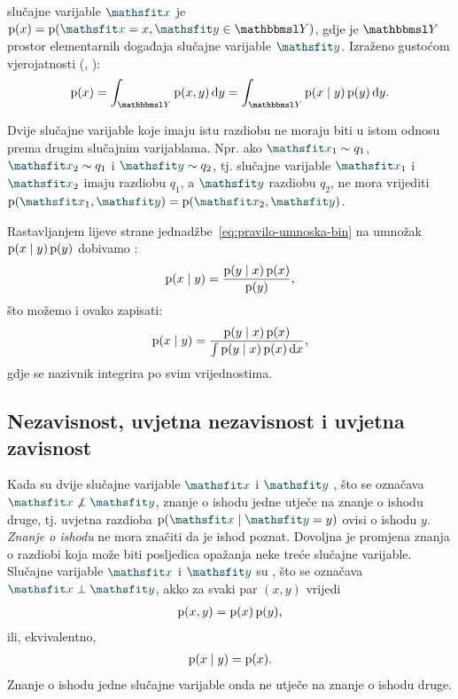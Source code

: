 \documentclass[utf8, diplomski, lmodern]{fer}
\begin{document}
 slučajne varijable $\rvar x$ je $\p(x)=\p(\rvar x=x,\rvar y\in\set Y)$, gdje je $\set Y$ prostor elementarnih događaja slučajne varijable $\rvar y$. Izraženo gustoćom vjerojatnosti (, ):
\begin{align}
\p(x) = \int_{\set Y}\p(x,y)\dif y = \int_{\set Y}\p(x\mid y)\p(y)\dif y \text{.}
\end{align}

Dvije slučajne varijable koje imaju istu razdiobu ne moraju biti u istom odnosu prema drugim slučajnim varijablama. Npr. ako $\rvar x_1\sim q_1$, $\rvar x_2\sim q_1$ i $\rvar y\sim q_2$, tj. slučajne varijable $\rvar x_1$ i $\rvar x_2$ imaju razdiobu $q_1$, a $\rvar y$ razdiobu $q_2$, ne mora vrijediti $\p(\rvar x_1, \rvar y) = \p(\rvar x_2, \rvar y)$.

Rastavljanjem lijeve strane jednadžbe~\eqref{eq:pravilo-umnoska-bin} na umnožak $\operatorname*{\mathrm{p}}(x\mid y)\operatorname*{\mathrm{p}}(y)$ dobivamo :
\begin{align}
\operatorname*{\mathrm{p}}(x\mid y) = \frac{\operatorname*{\mathrm{p}}(y\mid x)\operatorname*{\mathrm{p}}(x)}{\operatorname*{\mathrm{p}}(y)} \text{,}
\end{align}
što možemo i ovako zapisati:
\begin{align}
\operatorname*{\mathrm{p}}(x\mid y) = \frac{\operatorname*{\mathrm{p}}(y\mid x)\operatorname*{\mathrm{p}}(x)}{\int\operatorname*{\mathrm{p}}(y\mid x)\operatorname*{\mathrm{p}}(x)\mathop{}\!\mathrm{d} x} \text{,}
\end{align}
gdje se nazivnik integrira po svim vrijednostima.

\subsection{Nezavisnost, uvjetna nezavisnost i uvjetna zavisnost}

Kada su dvije slučajne varijable $\rvar x$ i $\rvar y$ , što se označava $\rvar x\not\perp\rvar y$, znanje o ishodu jedne utječe na znanje o ishodu druge, tj. uvjetna razdioba $\p\del{\rvar x\mid\rvar y = y}$ ovisi o ishodu $y$. \textit{Znanje o ishodu} ne mora značiti da je ishod poznat. Dovoljna je promjena znanja o razdiobi koja može biti posljedica opažanja neke treće slučajne varijable. Slučajne varijable $\rvar x$ i $\rvar y$ su , što se označava $\rvar x\perp\rvar y$, akko za svaki par $(x, y)$ vrijedi
\begin{align}
\operatorname*{\mathrm{p}}(x,y)=\operatorname*{\mathrm{p}}(x)\operatorname*{\mathrm{p}}(y) \text{,}
\end{align}
ili, ekvivalentno,
\begin{align}
\operatorname*{\mathrm{p}}(x\mid y) = \operatorname*{\mathrm{p}}(x) \text{.}
\end{align}
Znanje o ishodu jedne slučajne varijable onda ne utječe na znanje o ishodu druge.
\end{document}
